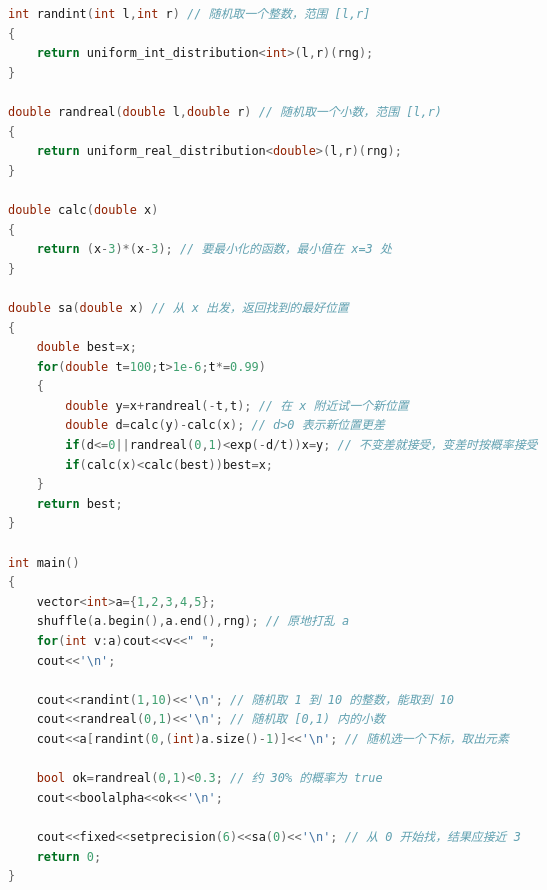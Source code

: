 \documentclass[10pt,landscape,a4paper]{article}
\begin{document}
\begin{multicols*}{3}
\begin{lstlisting}[language=C++]
int randint(int l,int r) // 随机取一个整数，范围 [l,r]
{
    return uniform_int_distribution<int>(l,r)(rng);
}

double randreal(double l,double r) // 随机取一个小数，范围 [l,r)
{
    return uniform_real_distribution<double>(l,r)(rng);
}

double calc(double x)
{
    return (x-3)*(x-3); // 要最小化的函数，最小值在 x=3 处
}

double sa(double x) // 从 x 出发，返回找到的最好位置
{
    double best=x;
    for(double t=100;t>1e-6;t*=0.99)
    {
        double y=x+randreal(-t,t); // 在 x 附近试一个新位置
        double d=calc(y)-calc(x); // d>0 表示新位置更差
        if(d<=0||randreal(0,1)<exp(-d/t))x=y; // 不变差就接受，变差时按概率接受
        if(calc(x)<calc(best))best=x;
    }
    return best;
}

int main()
{
    vector<int>a={1,2,3,4,5};
    shuffle(a.begin(),a.end(),rng); // 原地打乱 a
    for(int v:a)cout<<v<<" ";
    cout<<'\n';

    cout<<randint(1,10)<<'\n'; // 随机取 1 到 10 的整数，能取到 10
    cout<<randreal(0,1)<<'\n'; // 随机取 [0,1) 内的小数
    cout<<a[randint(0,(int)a.size()-1)]<<'\n'; // 随机选一个下标，取出元素

    bool ok=randreal(0,1)<0.3; // 约 30% 的概率为 true
    cout<<boolalpha<<ok<<'\n';

    cout<<fixed<<setprecision(6)<<sa(0)<<'\n'; // 从 0 开始找，结果应接近 3
    return 0;
}
\end{lstlisting}

\end{multicols*}
\end{document}
